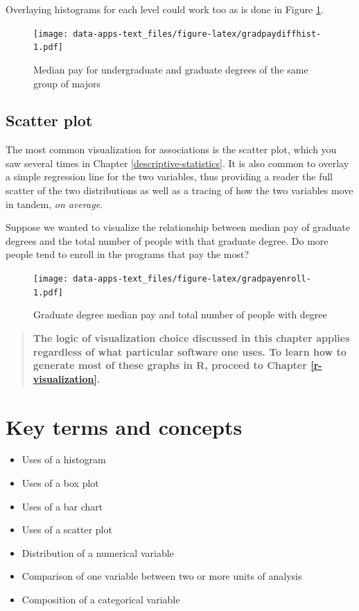 \documentclass[
]{book}
\providecommand{\tightlist}{%
  \setlength{\itemsep}{0pt}\setlength{\parskip}{0pt}}
\newenvironment{learncheck}%
{%
  \par\vspace{\baselineskip}\noindent 
  \color{Exercise}\begin{itshape}%
  \par\vspace{\baselineskip}\noindent\ignorespaces 
}%
{%
  \end{itshape}\ignorespacesafterend 
}
\begin{document}
Overlaying histograms for each level could work too as is done in Figure \ref{fig:gradpaydiffhist}.

\begin{figure}
\centering
\texttt{[image: data-apps-text\_files/figure-latex/gradpaydiffhist-1.pdf]}
\caption{\label{fig:gradpaydiffhist}Median pay for undergraduate and graduate degrees of the same group of majors}
\end{figure}

\hypertarget{scatter-plot}{%
\subsection{Scatter plot}\label{scatter-plot}}

The most common visualization for associations is the scatter plot, which you saw several times in Chapter \ref{descriptive-statistics}. It is also common to overlay a simple regression line for the two variables, thus providing a reader the full scatter of the two distributions as well as a tracing of how the two variables move in tandem, \emph{on average}.

Suppose we wanted to visualize the relationship between median pay of graduate degrees and the total number of people with that graduate degree. Do more people tend to enroll in the programs that pay the most?

\begin{figure}
\centering
\texttt{[image: data-apps-text\_files/figure-latex/gradpayenroll-1.pdf]}
\caption{\label{fig:gradpayenroll}Graduate degree median pay and total number of people with degree}
\end{figure}

\begin{quote}
\textbf{The logic of visualization choice discussed in this chapter applies regardless of what particular software one uses. To learn how to generate most of these graphs in R, proceed to Chapter \ref{r-visualization}.}
\end{quote}

\hypertarget{kt5}{%
\section{Key terms and concepts}\label{kt5}}

\begin{learncheck}
\begin{itemize}
\tightlist
\item
  Uses of a histogram
\item
  Uses of a box plot
\item
  Uses of a bar chart
\item
  Uses of a scatter plot
\item
  Distribution of a numerical variable
\item
  Comparison of one variable between two or more units of analysis
\item
  Composition of a categorical variable
\end{itemize}
\end{learncheck}
\end{document}

